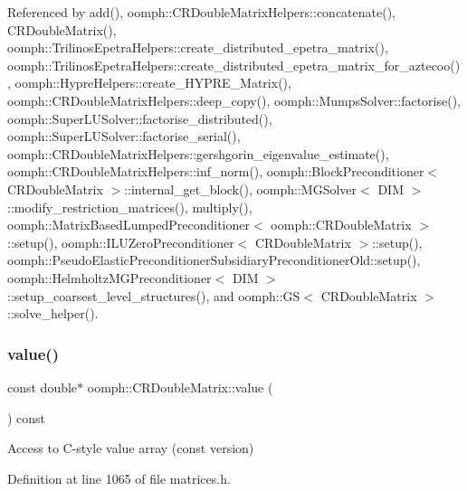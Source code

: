 Referenced by add(), oomph\+::\+C\+R\+Double\+Matrix\+Helpers\+::concatenate(), C\+R\+Double\+Matrix(), oomph\+::\+Trilinos\+Epetra\+Helpers\+::create\+\_\+distributed\+\_\+epetra\+\_\+matrix(), oomph\+::\+Trilinos\+Epetra\+Helpers\+::create\+\_\+distributed\+\_\+epetra\+\_\+matrix\+\_\+for\+\_\+aztecoo(), oomph\+::\+Hypre\+Helpers\+::create\+\_\+\+H\+Y\+P\+R\+E\+\_\+\+Matrix(), oomph\+::\+C\+R\+Double\+Matrix\+Helpers\+::deep\+\_\+copy(), oomph\+::\+Mumps\+Solver\+::factorise(), oomph\+::\+Super\+L\+U\+Solver\+::factorise\+\_\+distributed(), oomph\+::\+Super\+L\+U\+Solver\+::factorise\+\_\+serial(), oomph\+::\+C\+R\+Double\+Matrix\+Helpers\+::gershgorin\+\_\+eigenvalue\+\_\+estimate(), oomph\+::\+C\+R\+Double\+Matrix\+Helpers\+::inf\+\_\+norm(), oomph\+::\+Block\+Preconditioner$<$ C\+R\+Double\+Matrix $>$\+::internal\+\_\+get\+\_\+block(), oomph\+::\+M\+G\+Solver$<$ D\+I\+M $>$\+::modify\+\_\+restriction\+\_\+matrices(), multiply(), oomph\+::\+Matrix\+Based\+Lumped\+Preconditioner$<$ oomph\+::\+C\+R\+Double\+Matrix $>$\+::setup(), oomph\+::\+I\+L\+U\+Zero\+Preconditioner$<$ C\+R\+Double\+Matrix $>$\+::setup(), oomph\+::\+Pseudo\+Elastic\+Preconditioner\+Subsidiary\+Preconditioner\+Old\+::setup(), oomph\+::\+Helmholtz\+M\+G\+Preconditioner$<$ D\+I\+M $>$\+::setup\+\_\+coarsest\+\_\+level\+\_\+structures(), and oomph\+::\+G\+S$<$ C\+R\+Double\+Matrix $>$\+::solve\+\_\+helper().

\mbox{\label{classoomph_1_1CRDoubleMatrix_a2b0895f75ec750c386f0dbc11bfbf57b}} 
\subsubsection{\texorpdfstring{value()}{value()}\hspace{0.1cm}{\footnotesize\ttfamily [2/2]}}
{\footnotesize\ttfamily const double$\ast$ oomph\+::\+C\+R\+Double\+Matrix\+::value (\begin{DoxyParamCaption}{ }\end{DoxyParamCaption}) const\hspace{0.3cm}{\ttfamily [inline]}}



Access to C-\/style value array (const version) 



Definition at line 1065 of file matrices.\+h.



